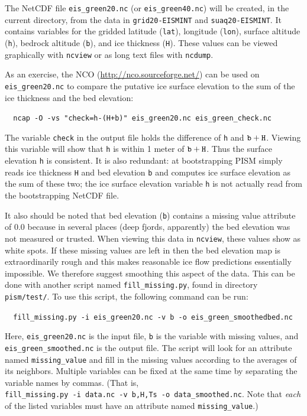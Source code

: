 \documentclass[11pt,final]{amsart}
\begin{document}
The NetCDF file \verb|eis_green20.nc| (or \verb|eis_green40.nc|) will be created, in the current directory, from the data in \verb|grid20-EISMINT| and \verb|suaq20-EISMINT|.  It contains variables for the gridded latitude (\verb|lat|), longitude (\verb|lon|), surface altitude (\verb|h|), bedrock altitude (\verb|b|), and ice thickness (\verb|H|).  These values can be viewed graphically with \verb|ncview| or as long text files with \verb|ncdump|.

As an exercise, the NCO (\url{http://nco.sourceforge.net/}) can be used on \verb|eis_green20.nc| to compare the putative ice surface elevation to the sum of the ice thickness and the bed elevation:

\verb|  ncap -O -vs "check=h-(H+b)" eis_green20.nc eis_green_check.nc|

\noindent The variable \verb|check| in the output file holds the difference of \verb|h| and $\verb|b|+\verb|H|$.  Viewing this variable will show that \verb|h| is within 1 meter of $\verb|b|+\verb|H|$.  Thus the surface elevation \verb|h| is consistent.  It is also redundant: at bootstrapping PISM simply reads ice thickness \verb|H| and bed elevation \verb|b| and computes ice surface elevation as the sum of these two; the ice surface elevation variable \verb|h| is not actually read from the bootstrapping NetCDF file.

It also should be noted that bed elevation (\verb|b|) contains a missing value attribute of $0.0$ because in several places (deep fjords, apparently) the bed elevation was not measured or trusted.  When viewing this data in \verb|ncview|, these values show as white spots. If these missing values are left in then the bed elevation map is extraordinarily rough and this makes reasonable ice flow predictions essentially impossible.  We therefore suggest smoothing this aspect of the data.  This can be done with another script named \verb|fill_missing.py|, found in directory \verb|pism/test/|. To use this script, the following command can be run:

\verb|  fill_missing.py -i eis_green20.nc -v b -o eis_green_smoothedbed.nc|

\noindent Here, \verb|eis_green20.nc| is the input file, \verb|b| is the variable with missing values, and \verb|eis_green_smoothed.nc| is the output file. The script will look for an attribute named \verb|missing_value| and fill in the missing values according to the averages of its neighbors.  Multiple variables can be fixed at the same time by separating the variable names by commas.  (That is,\\
\verb|fill_missing.py -i data.nc -v b,H,Ts -o data_smoothed.nc|.  Note that \emph{each} of the listed variables must have an attribute named \verb|missing_value|.)
\end{document}
